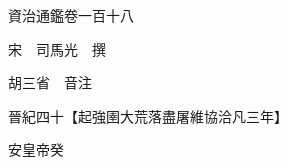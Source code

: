 










 


 
 


 

  
  
  
  
  





  
  
  
  
  
 
  

  

  
  
  



  

 
 

  
   




  

  
  


  　　資治通鑑卷一百十八

　　宋　司馬光　撰

　　胡三省　音注

　　晉紀四十【起強圉大荒落盡屠維協洽凡三年】

　　安皇帝癸

